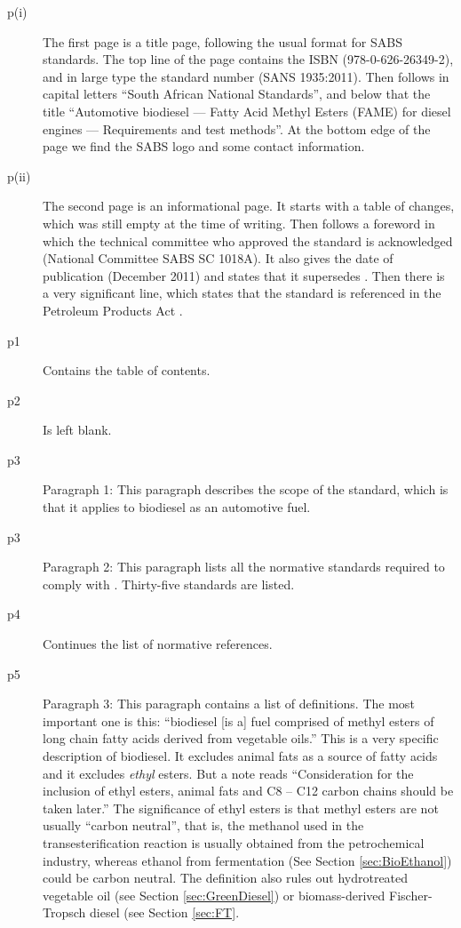 \begin{description}


\item[p(i)]{The first page is a title page, following the usual format for SABS
standards. The top line of the page contains the ISBN (978-0-626-26349-2), and
in large type the standard number (SANS 1935:2011). Then follows in capital
letters ``South African National Standards'', and below that the title
``Automotive biodiesel --- Fatty Acid Methyl Esters (FAME) for diesel engines
--- Requirements and test methods''. At the bottom edge of the page we find the
SABS logo and some contact information.}

\item[p(ii)]{The second page is an informational page. It starts with a table of
changes, which was still empty at the time of writing. Then follows a foreword
in which the technical committee who approved the standard is acknowledged
(National Committee SABS SC 1018A). It also gives the date of publication
(December 2011) and states that it supersedes . Then there is a
very significant line, which states that the standard is referenced in the
Petroleum Products Act \autocite{Act120-1997}. }
	
\item[p1]{Contains the table of contents.} 

\item[p2]{Is left blank.}

\item[p3]{Paragraph 1: This paragraph describes the scope of the standard, which
is that it applies to biodiesel as an automotive fuel.} 

\item[p3]{Paragraph 2:
This paragraph lists all the normative standards required to comply with . Thirty-five standards are listed.}

\item[p4]{Continues the list of normative references.}

\item[p5]{Paragraph 3: This paragraph contains a list of definitions. The most
important one is this: ``biodiesel [is a] fuel comprised of methyl esters of
long chain fatty acids derived from vegetable oils.'' This is a very specific
description of biodiesel. It excludes animal fats as a source of fatty acids and
it excludes \textit{ethyl} esters. But a note reads ``Consideration for the
inclusion of ethyl esters, animal fats and C8 – C12 carbon chains should be
taken later.'' The significance of ethyl esters is that methyl esters are not
usually ``carbon neutral'', that is, the methanol used in the
transesterification reaction is usually obtained from the petrochemical
industry, whereas ethanol from fermentation (See Section \ref{sec:BioEthanol})
could be carbon neutral.
The definition also rules out hydrotreated vegetable oil (see Section
\ref{sec:GreenDiesel}) or biomass-derived Fischer-Tropsch diesel (see Section
\ref{sec:FT}.}


\end{description}
